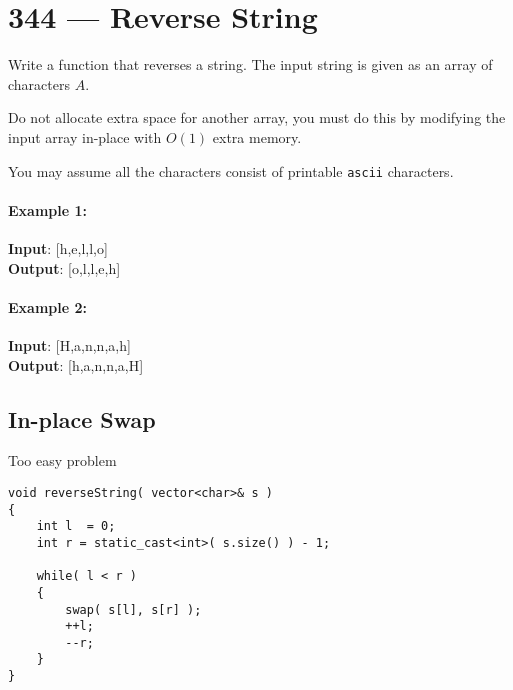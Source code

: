 \section{344 --- Reverse String}
Write a function that reverses a string. The input string is given as an array of characters $A$.
\par
Do not allocate extra space for another array, you must do this by modifying the input array in-place with $O(1)$ extra memory.
\par
You may assume all the characters consist of printable \texttt{ascii} characters.

 

\paragraph{Example 1:}

\begin{flushleft}
\textbf{Input}: [h,\quad e,\quad l,\quad l,\quad o]
\\
\textbf{Output}: [o,\quad l,\quad l,\quad e,\quad h]
\end{flushleft}

\paragraph{Example 2:}

\begin{flushleft}
\textbf{Input}: [H,\quad a,\quad n,\quad n,\quad a,\quad h]
\\
\textbf{Output}: [h,\quad a,\quad n,\quad n,\quad a,\quad H]
\end{flushleft}

\subsection{In-place Swap}
Too easy problem

\setcounter{lstlisting}{0}
\begin{lstlisting}[style=customc, caption={In-place Swap}]
void reverseString( vector<char>& s )
{
    int l  = 0;
    int r = static_cast<int>( s.size() ) - 1;

    while( l < r )
    {
        swap( s[l], s[r] );
        ++l;
        --r;
    }
}
\end{lstlisting}